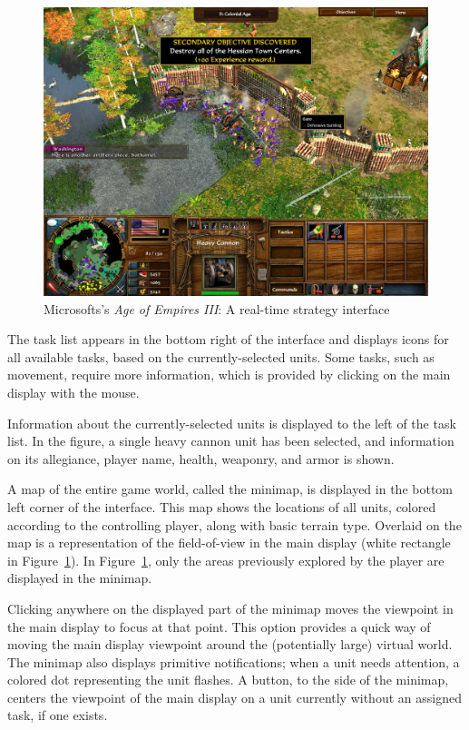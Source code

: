 \begin{figure}[ht]
\begin{center}
\includegraphics[width=5in]{images/age_of_empires_3.jpg}
\caption{Microsofts's \emph{Age of Empires III}: A real-time strategy interface \label{fig:aoe3}}
\end{center}
\end{figure}


The task list appears in the bottom right of the interface and displays icons for all available tasks, based on the currently-selected units. Some tasks, such as movement, require more information, which is provided by clicking on the main display with the mouse.

Information about the currently-selected units is displayed to the left of the task list. In the figure, a single heavy cannon unit has been selected, and information on its allegiance, player name, health, weaponry, and armor is shown.

A map of the entire game world, called the minimap, is displayed in the bottom left corner of the interface. This map shows the locations of all units, colored according to the controlling player, along with basic terrain type. Overlaid on the map is a representation of the field-of-view in the main display (white rectangle in Figure~\ref{fig:aoe3}). In Figure~\ref{fig:aoe3}, only the areas previously explored by the player are displayed in the minimap. %

Clicking anywhere on the displayed part of the minimap moves the viewpoint in the main display to focus at that point. This option provides a quick way of moving the main display viewpoint around the (potentially large) virtual world. The minimap also displays primitive notifications; when a unit needs attention, a colored dot representing the unit flashes. A button, to the side of the minimap, centers the viewpoint of the main display on a unit currently without an assigned task, if one exists.


